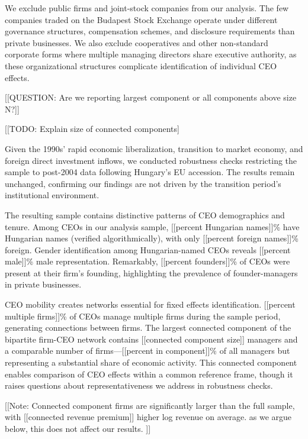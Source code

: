 \documentclass[11pt,a4paper]{article}
\begin{document}
We exclude public firms and joint-stock companies from our analysis. The few companies traded on the Budapest Stock Exchange operate under different governance structures, compensation schemes, and disclosure requirements than private businesses. We also exclude cooperatives and other non-standard corporate forms where multiple managing directors share executive authority, as these organizational structures complicate identification of individual CEO effects.



[[QUESTION: Are we reporting largest component or all components above size N?]]

[[TODO: Explain size of connected components]

Given the 1990s' rapid economic liberalization, transition to market economy, and foreign direct investment inflows, we conducted robustness checks restricting the sample to post-2004 data following Hungary's EU accession. The results remain unchanged, confirming our findings are not driven by the transition period's institutional environment.

The resulting sample contains distinctive patterns of CEO demographics and tenure. Among CEOs in our analysis sample, [[percent Hungarian names]]\% have Hungarian names (verified algorithmically), with only [[percent foreign names]]\% foreign. Gender identification among Hungarian-named CEOs reveals [[percent male]]\% male representation. Remarkably, [[percent founders]]\% of CEOs were present at their firm's founding, highlighting the prevalence of founder-managers in private businesses.

CEO mobility creates networks essential for fixed effects identification. [[percent multiple firms]]\% of CEOs manage multiple firms during the sample period, generating connections between firms. The largest connected component of the bipartite firm-CEO network contains [[connected component size]] managers and a comparable number of firms—[[percent in component]]\% of all managers but representing a substantial share of economic activity. This connected component enables comparison of CEO effects within a common reference frame, though it raises questions about representativeness we address in robustness checks.

[[Note: Connected component firms are significantly larger than the full sample, with [[connected revenue premium]] higher log revenue on average. as we argue below, this does not affect our results. ]]
\end{document}
